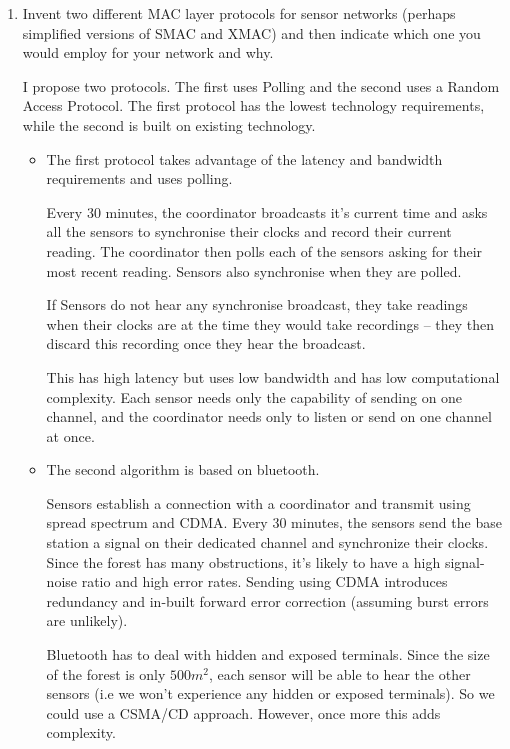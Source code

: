 \documentclass[10pt,\jkfside,a4paper]{article}
\begin{document}
\begin{enumerate}[label=(\alph*)]
\begin{enumerate}[label=(\roman*)]
\begin{itemize}
\end{itemize}

\item Invent two different MAC layer protocols for sensor networks (perhaps
simplified versions of SMAC and XMAC) and then indicate which one you would
employ for your network and why.

I propose two protocols. The first uses Polling and the second uses a
Random Access Protocol. The first protocol has the lowest technology
requirements, while the second is built on existing technology.

\begin{itemize}

\item The first protocol takes advantage of the latency and bandwidth
requirements and uses polling.

Every 30 minutes, the coordinator broadcasts it's current time and asks all
the sensors to synchronise their clocks and record their current reading. The
coordinator then polls each of the sensors asking for their most recent
reading. Sensors also synchronise when they are polled.

If Sensors do not hear any synchronise broadcast, they take readings
when their clocks are at the time they would take recordings -- they then
discard this recording once they hear the broadcast.

This has high latency but uses low bandwidth and has low computational
complexity. Each sensor needs only the capability of sending on one channel,
and the coordinator needs only to listen or send on one channel at once.

\item The second algorithm is based on bluetooth.

Sensors establish a connection with a coordinator and transmit using spread
spectrum and CDMA\@. Every 30 minutes, the sensors send the base station a
signal on their dedicated channel and synchronize their clocks. Since the
forest has many obstructions, it's likely to have a high signal-noise ratio
and high error rates. Sending using CDMA introduces redundancy and in-built
forward error correction (assuming burst errors are unlikely).

Bluetooth has to deal with hidden and exposed terminals. Since the size of
the forest is only $500m^2$, each sensor will be able to hear the other
sensors (i.e we won't experience any hidden or exposed terminals). So we
could use a CSMA/CD approach. However, once more this adds complexity.


\end{itemize}
\end{enumerate}
\end{enumerate}
\end{document}
